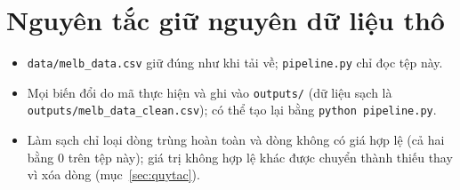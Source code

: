 
\section{Nguyên tắc giữ nguyên dữ liệu thô}\label{sec:nguyenven}
\begin{itemize}[nosep]
  \item \texttt{data/melb\_data.csv} giữ đúng như khi tải về; \texttt{pipeline.py} chỉ đọc tệp này.
  \item Mọi biến đổi do mã thực hiện và ghi vào \texttt{outputs/} (dữ liệu sạch là \texttt{outputs/melb\_data\_clean.csv}); có thể tạo lại bằng \texttt{python pipeline.py}.
  \item Làm sạch chỉ loại dòng trùng hoàn toàn và dòng không có giá hợp lệ (cả hai bằng 0 trên tệp này); giá trị không hợp lệ khác được chuyển thành thiếu thay vì xóa dòng (mục~\ref{sec:quytac}).
\end{itemize}
